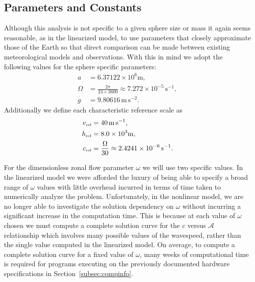 \subsection{Parameters and Constants}
\label{subsec:incomparams}
Although this analysis is not specific to a given sphere size or mass it again seems reasonable, as in the linearized model, to use parameters that closely approximate those of the Earth so that direct comparison can be made between existing meteorological models and observations. With this in mind we adopt the following values for the sphere specific parameters:
\begin{align}
a&=6.37122\times10^6\text{m},\\
\Omega&=\frac{2 \pi}{24\times3600}\approx7.272\times10^{-5}\,\text{s}^{-1},\\
g&=9.80616\,\text{m}\,\text{s}^{-2}.
\end{align}
Additionally we define each characteristic reference scale as
\begin{align}
v_{\mbox{\tiny ref}}&=40\,\text{m}\,\text{s}^{-1},\\
h_{\mbox{\tiny ref}}&=8.0\times10^{3}\text{m},\\
c_{\mbox{\tiny ref}}&=\frac{\Omega}{30}\approx2.4241\times10^{-6}\,\text{s}^{-1}.
\end{align}

For the dimensionless zonal flow parameter $\omega$ we will use two specific values. In the linearized model we were afforded the luxury of being able to specify a broad range of $\omega$ values with little overhead incurred in terms of time taken to numerically analyze the problem. Unfortunately, in the nonlinear model, we are no longer able to investigate the solution dependency on $\omega$ without incurring a significant increase in the computation time. This is because at each value of $\omega$ chosen we must compute a complete solution curve for the $c$ versus $\mathcal{A}$ relationship which involves many possible values of the wavespeed, rather than the single value computed in the linearized model. On average, to compute a complete solution curve for a fixed value of $\omega$, many weeks of computational time is required for programs executing on the previously documented hardware specifications in Section~\ref{subsec:compinfo}.

